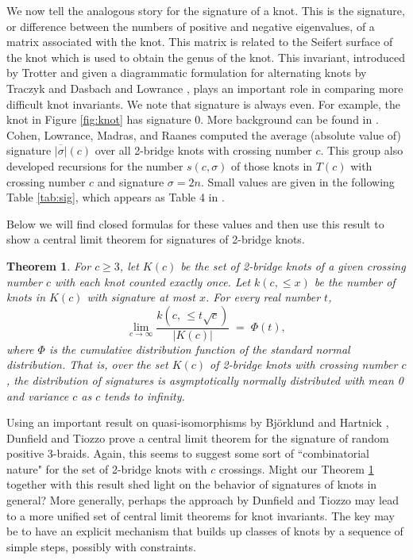 \documentclass[11pt]{amsart}
\newtheorem{theorem}{Theorem}[section]
\theoremstyle{definition}
\theoremstyle{remark}
\numberwithin{equation}{section}
\begin{document}
We now tell the analogous story for the signature of a knot.  This is the signature, or difference between the numbers of positive and negative eigenvalues, of a matrix associated with the knot.  This matrix is related to the Seifert surface of the knot which is used to obtain the genus of the knot.  This invariant, introduced by Trotter \cite{Trotter} and given a diagrammatic formulation for alternating knots by Traczyk \cite{Tra} and Dasbach and Lowrance \cite{DasLow:sig}, plays an important role in comparing more difficult knot invariants.  We note that signature is always even.  For example, the knot in Figure \ref{fig:knot} has signature 0.  More background can be found in \cite{CLMR}.  Cohen, Lowrance, Madras, and Raanes \cite{CLMR} computed the average (absolute value of) signature $\overline{|\sigma|}(c)$ over all 2-bridge knots with crossing number $c$.  This group also developed recursions for the number $s(c,\sigma)$ of those knots in $T(c)$ with crossing number $c$ and signature $\sigma=2n$.  Small values are given in the following Table \ref{tab:sig}, which appears as Table 4 in \cite{CLMR}.

Below we will find closed formulas for these values and then use this result to show a central limit theorem for signatures of 2-bridge knots.  

\begin{theorem}
\label{thm:CLT}
For $c\geq 3$, let $K(c)$ be the set of 2-bridge knots of a given crossing number $c$ with each knot counted exactly once.  Let $k(c,\leq x)$ be the number of knots in $K(c)$ with signature at most $x$.  
For every real number $t$,
\begin{equation}
    \label{eq.CLTk}
    \lim_{c\rightarrow\infty}  \frac{k\left(c, \,\leq t\sqrt{c}\right)}{|K(c)|}   \;=\; \Phi(t),
\end{equation}
where $\Phi$ is the cumulative distribution  function of the standard normal distribution. 
That is, over the set $K(c)$ of 2-bridge knots with crossing number $c$, the distribution of signatures 
is asymptotically normally distributed  with mean 0 and variance $c$ as $c$ tends to infinity.
\end{theorem}




Using an important result on quasi-isomorphisms by Bj\"orklund and Hartnick \cite{BjoHar}, Dunfield and Tiozzo \cite{DunTio} prove a central limit theorem for the signature of random positive 3-braids.  Again, this seems to suggest some sort of ``combinatorial nature" for the set of 2-bridge knots with $c$ crossings. 
Might our Theorem \ref{thm:CLT} together with this result shed light on the behavior of  signatures of knots in general?  More generally, perhaps the approach by Dunfield and Tiozzo may lead to a more unified set of central limit theorems for knot invariants.  
 The key may be to have an explicit mechanism that builds up classes of knots by a sequence of
simple steps, possibly with constraints.
\end{document}
